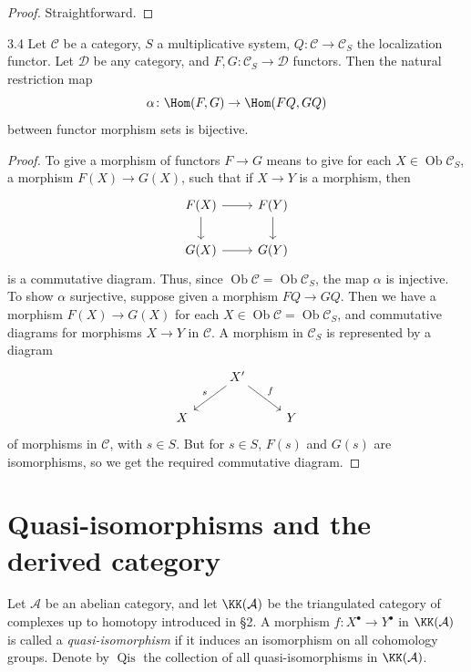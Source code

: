 \begin{proof}
Straightforward.
\end{proof}

\begin{bookproposition}{3.4}\label{prop:1.3.4}
Let $\mathcal{C}$ be a category, $S$ a multiplicative system, $Q\colon\mathcal{C}\to\mathcal{C}_S$ the localization functor. Let $\mathcal{D}$ be any category, and $F,G\colon\mathcal{C}_S\to\mathcal{D}$ functors. Then the natural restriction map
\[
\alpha\colon \Hom(F,G) \to \Hom(FQ,GQ)
\]
between functor morphism sets is bijective.
\end{bookproposition}

\begin{proof}
To give a morphism of functors \(F \longrightarrow G\) means to give for each \(X \in \operatorname{Ob} \mathcal{C}_S\), a morphism \(F(X) \longrightarrow G(X)\), such that if \(X \longrightarrow Y\) is a morphism, then
\[
\begin{tikzcd}
	F(X) \arrow[r] \arrow[d] & F(Y) \arrow[d] \\
	G(X) \arrow[r] & G(Y)
\end{tikzcd}
\]
is a commutative diagram. Thus, since \(\operatorname{Ob} \mathcal{C} = \operatorname{Ob} \mathcal{C}_S\), the map \(\alpha\) is injective. To show \(\alpha\) surjective, suppose given a morphism \(FQ \longrightarrow GQ\). Then we have a morphism \(F(X) \longrightarrow G(X)\) for each \(X \in \operatorname{Ob} \mathcal{C} = \operatorname{Ob} \mathcal{C}_S\), and commutative diagrams for morphisms \(X \longrightarrow Y\) in \(\mathcal{C}\). A morphism in \(\mathcal{C}_S\) is represented by a diagram
\[
\begin{tikzcd}
	& X' \arrow[ld, "s"'] \arrow[rd, "f"] & \\
	X & & Y
\end{tikzcd}
\]
of morphisms in \(\mathcal{C}\), with \(s \in S\). But for \(s \in S\), \(F(s)\) and \(G(s)\) are isomorphisms, so we get the required commutative diagram.

\end{proof}

\section{Quasi-isomorphisms and the derived category}\label{sec:1.4}

Let $\mathcal{A}$ be an abelian category, and let $\KK(\mathcal{A})$ be the triangulated category of complexes up to homotopy introduced in \S2. A morphism $f\colon X^\bullet\to Y^\bullet$ in $\KK(\mathcal{A})$ is called a \emph{quasi-isomorphism} if it induces an isomorphism on all cohomology groups. Denote by $\operatorname{Qis}$ the collection of all quasi-isomorphisms in $\KK(\mathcal{A})$.

